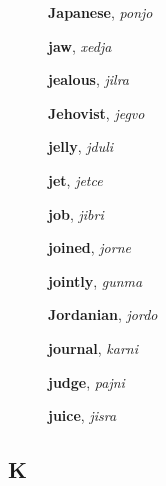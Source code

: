 \documentclass[12pt]{book}
\begin{document}
\begin{description}

\item[ ] \textbf{Japanese}, \textit{ponjo}

\item[ ] \textbf{jaw}, \textit{xedja}

\item[ ] \textbf{jealous}, \textit{jilra}

\item[ ] \textbf{Jehovist}, \textit{jegvo}

\item[ ] \textbf{jelly}, \textit{jduli}

\item[ ] \textbf{jet}, \textit{jetce}

\item[ ] \textbf{job}, \textit{jibri}

\item[ ] \textbf{joined}, \textit{jorne}

\item[ ] \textbf{jointly}, \textit{gunma}

\item[ ] \textbf{Jordanian}, \textit{jordo}

\item[ ] \textbf{journal}, \textit{karni}

\item[ ] \textbf{judge}, \textit{pajni}

\item[ ] \textbf{juice}, \textit{jisra}



\end{description}



\subsection{K} %
\end{document}
